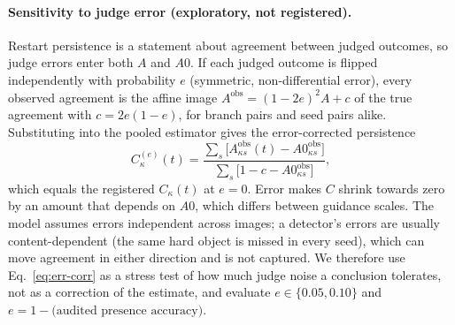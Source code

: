 \paragraph{Sensitivity to judge error (exploratory, not registered).} Restart persistence is a statement about agreement between judged outcomes, so judge errors enter both $A$ and $A0$. If each judged outcome is flipped independently with probability $e$ (symmetric, non-differential error), every observed agreement is the affine image $A^{\mathrm{obs}}=(1-2e)^2A+c$ of the true agreement with $c=2e(1-e)$, for branch pairs and seed pairs alike. Substituting into the pooled estimator gives the error-corrected persistence
\begin{equation}\label{eq:err-corr}
C_\kappa^{(e)}(t)=\frac{\sum_s\big[A^{\mathrm{obs}}_{\kappa s}(t)-A0^{\mathrm{obs}}_{\kappa s}\big]}{\sum_s\big[1-c-A0^{\mathrm{obs}}_{\kappa s}\big]},
\end{equation}
which equals the registered $C_\kappa(t)$ at $e=0$. Error makes $C$ shrink towards zero by an amount that depends on $A0$, which differs between guidance scales. The model assumes errors independent across images; a detector's errors are usually content-dependent (the same hard object is missed in every seed), which can move agreement in either direction and is not captured. We therefore use Eq.~\eqref{eq:err-corr} as a stress test of how much judge noise a conclusion tolerates, not as a correction of the estimate, and evaluate $e\in\{0.05,0.10\}$ and $e=1-\text{(audited presence accuracy)}$.
